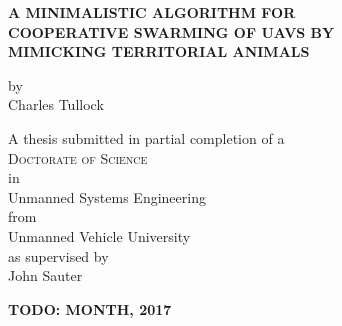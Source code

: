 \begin{titlepage}
	\begin{center}

		\vspace*{1cm}
		 
		\large{ \textbf{ \uppercase{A minimalistic algorithm for\\cooperative swarming of UAVs by\\mimicking territorial animals}}}
		
		
		\vspace{1.5cm}
		
		by\\
		Charles Tullock\\
		
		\vspace{1.5cm}
		
		A thesis submitted in partial completion of a\\
		\large{\textsc{Doctorate of Science}}\\ 
		in\\
		\large{Unmanned Systems Engineering}\\
		from\\
		\large{Unmanned Vehicle University}\\
		as supervised by\\
		\large{John Sauter}
		
		\vspace{2cm}
		\textbf{TODO: MONTH, 2017}
		
		\vfill

	\end{center}
\thispagestyle{empty}
\end{titlepage}

